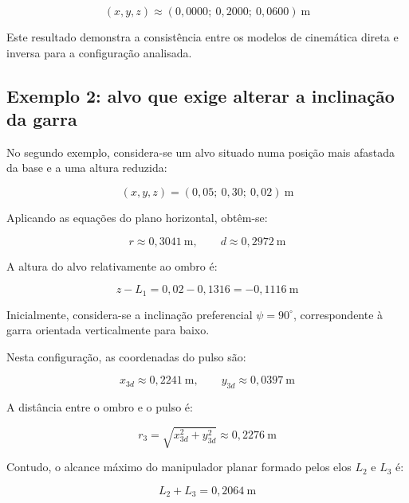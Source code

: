 \begin{equation}
    (x,y,z)\approx
    (0{,}0000;\ 0{,}2000;\ 0{,}0600)
    \ \text{m}
\end{equation}

Este resultado demonstra a consistência entre os modelos de cinemática direta e inversa para a configuração analisada.

\subsection{Exemplo 2: alvo que exige alterar a inclinação da garra}

No segundo exemplo, considera-se um alvo situado numa posição mais afastada da base e a uma altura reduzida:

\begin{equation}
    (x,y,z)=(0{,}05;\ 0{,}30;\ 0{,}02)
    \ \text{m}
\end{equation}

Aplicando as equações do plano horizontal, obtêm-se:

\begin{equation}
    r\approx0{,}3041\ \text{m},
    \qquad
    d\approx0{,}2972\ \text{m}
\end{equation}

A altura do alvo relativamente ao ombro é:

\begin{equation}
    z-L_1=0{,}02-0{,}1316
    =-0{,}1116\ \text{m}
\end{equation}

Inicialmente, considera-se a inclinação preferencial $\psi=90^\circ$, correspondente à garra orientada verticalmente para baixo.

Nesta configuração, as coordenadas do pulso são:

\begin{equation}
    x_{3d}\approx0{,}2241\ \text{m},
    \qquad
    y_{3d}\approx0{,}0397\ \text{m}
\end{equation}

A distância entre o ombro e o pulso é:

\begin{equation}
    r_3=\sqrt{x_{3d}^2+y_{3d}^2}
    \approx0{,}2276\ \text{m}
\end{equation}

Contudo, o alcance máximo do manipulador planar formado pelos elos $L_2$ e $L_3$ é:

\begin{equation}
    L_2+L_3=0{,}2064\ \text{m}
\end{equation}

